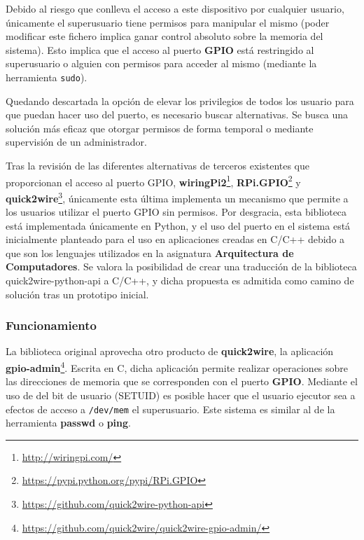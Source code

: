 Debido al riesgo que conlleva el acceso a este dispositivo por cualquier usuario, únicamente el superusuario tiene permisos para manipular el mismo (poder modificar este fichero implica ganar control absoluto sobre la memoria del sistema). Esto implica que el acceso al puerto \textbf{GPIO} está restringido al superusuario o alguien con permisos para acceder al mismo (mediante la herramienta \texttt{sudo}).

Quedando descartada la opción de elevar los privilegios de todos los usuario para que puedan hacer uso del puerto, es necesario buscar alternativas. Se busca una solución más eficaz que otorgar permisos de forma temporal o mediante supervisión de un administrador.

Tras la revisión de las diferentes alternativas de terceros existentes que proporcionan el acceso al puerto GPIO, \textbf{wiringPi2}\footnote{\href{http://wiringpi.com/}{http://wiringpi.com/}}, \textbf{RPi.GPIO}\footnote{\href{https://pypi.python.org/pypi/RPi.GPIO}{https://pypi.python.org/pypi/RPi.GPIO}} y \textbf{quick2wire}\footnote{\href{https://github.com/quick2wire-python-api}{https://github.com/quick2wire-python-api}}, únicamente esta última implementa un mecanismo que permite a los usuarios utilizar el puerto GPIO sin permisos. Por desgracia, esta biblioteca está implementada únicamente en Python, y el uso del puerto en el sistema está inicialmente planteado para el uso en aplicaciones creadas en C/C++ debido a que son los lenguajes utilizados en la asignatura \textbf{Arquitectura de Computadores}. Se valora la posibilidad de crear una traducción de la biblioteca quick2wire-python-api a C/C++, y dicha propuesta es admitida como camino de solución tras un prototipo inicial.

\subsubsection{Funcionamiento}

La biblioteca original aprovecha otro producto de \textbf{quick2wire}, la aplicación \textbf{gpio-admin}\footnote{\href{https://github.com/quick2wire/quick2wire-gpio-admin/}{https://github.com/quick2wire/quick2wire-gpio-admin/}}. Escrita en C, dicha aplicación permite realizar operaciones sobre las direcciones de memoria que se corresponden con el puerto \textbf{GPIO}. Mediante el uso de del bit de usuario (SETUID) es posible hacer que el usuario ejecutor sea a efectos de acceso a \texttt{/dev/mem} el superusuario. Este sistema es similar al de la herramienta \textbf{passwd} o \textbf{ping}.

